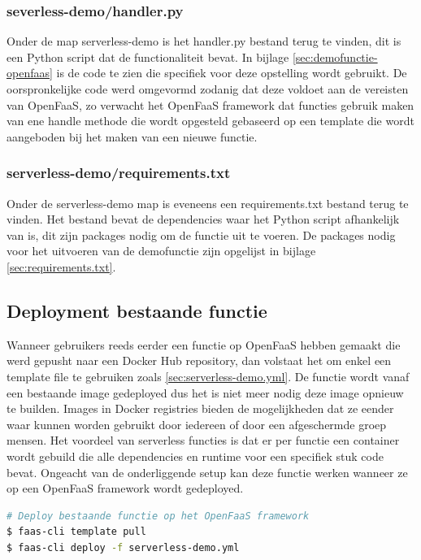 \subsubsection{severless-demo/handler.py}
Onder de map serverless-demo is het handler.py bestand terug te vinden, dit is een Python script dat de functionaliteit bevat. In bijlage \ref{sec:demofunctie-openfaas} is de code te zien die specifiek voor deze opstelling wordt gebruikt. De oorspronkelijke code werd omgevormd zodanig dat deze voldoet aan de vereisten van OpenFaaS, zo verwacht het OpenFaaS framework dat functies gebruik maken van ene handle methode die wordt opgesteld gebaseerd op een template die wordt aangeboden bij het maken van een nieuwe functie.

\subsubsection{serverless-demo/requirements.txt}
Onder de serverless-demo map is eveneens een requirements.txt bestand terug te vinden. Het bestand bevat de dependencies waar het Python script afhankelijk van is, dit zijn packages nodig om de functie uit te voeren. De packages  nodig voor het uitvoeren van de demofunctie zijn opgelijst in bijlage \ref{sec:requirements.txt}.

\subsection{Deployment bestaande functie}
Wanneer gebruikers reeds eerder een functie op OpenFaaS hebben gemaakt die werd gepusht naar een Docker Hub repository, dan volstaat het om enkel een template file te gebruiken zoals \ref{sec:serverless-demo.yml}. De functie wordt vanaf een bestaande image gedeployed dus het is niet meer nodig deze image opnieuw te builden. Images in Docker registries bieden de mogelijkheden dat ze eender waar kunnen worden gebruikt door iedereen of door een afgeschermde groep mensen. Het voordeel van serverless functies is dat er per functie een container wordt gebuild die alle dependencies en runtime voor een specifiek stuk code bevat. Ongeacht van de onderliggende setup kan deze functie werken wanneer ze op een OpenFaaS framework wordt gedeployed.

\begin{lstlisting}[language=bash]
# Deploy bestaande functie op het OpenFaaS framework
$ faas-cli template pull
$ faas-cli deploy -f serverless-demo.yml
\end{lstlisting}

